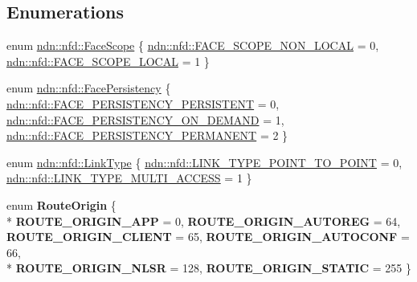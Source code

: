 \subsection*{Enumerations}
\begin{DoxyCompactItemize}
\item 
enum \hyperlink{group__management_gaa49e0fd703a14e5bf904d15428fd6059}{ndn\+::nfd\+::\+Face\+Scope} \{ \hyperlink{group__management_ggaa49e0fd703a14e5bf904d15428fd6059ab79946898b7e484062fa9eae0df1e67d}{ndn\+::nfd\+::\+F\+A\+C\+E\+\_\+\+S\+C\+O\+P\+E\+\_\+\+N\+O\+N\+\_\+\+L\+O\+C\+AL} = 0, 
\hyperlink{group__management_ggaa49e0fd703a14e5bf904d15428fd6059a96a6343f404f0aaea1ab481bdc704f59}{ndn\+::nfd\+::\+F\+A\+C\+E\+\_\+\+S\+C\+O\+P\+E\+\_\+\+L\+O\+C\+AL} = 1
 \}
\item 
enum \hyperlink{group__management_ga05df4b7c484a0fae25d3e65962511bac}{ndn\+::nfd\+::\+Face\+Persistency} \{ \hyperlink{group__management_gga05df4b7c484a0fae25d3e65962511bacaaebdd2e1f8ad08e833602ba66aed6de0}{ndn\+::nfd\+::\+F\+A\+C\+E\+\_\+\+P\+E\+R\+S\+I\+S\+T\+E\+N\+C\+Y\+\_\+\+P\+E\+R\+S\+I\+S\+T\+E\+NT} = 0, 
\hyperlink{group__management_gga05df4b7c484a0fae25d3e65962511baca96bad6012957ccb9a479076d632d4657}{ndn\+::nfd\+::\+F\+A\+C\+E\+\_\+\+P\+E\+R\+S\+I\+S\+T\+E\+N\+C\+Y\+\_\+\+O\+N\+\_\+\+D\+E\+M\+A\+ND} = 1, 
\hyperlink{group__management_gga05df4b7c484a0fae25d3e65962511bacab48510009b1ffbcc656493c424aa3446}{ndn\+::nfd\+::\+F\+A\+C\+E\+\_\+\+P\+E\+R\+S\+I\+S\+T\+E\+N\+C\+Y\+\_\+\+P\+E\+R\+M\+A\+N\+E\+NT} = 2
 \}
\item 
enum \hyperlink{group__management_gaa49a53cb4fe262ed33b001ccbe9c3502}{ndn\+::nfd\+::\+Link\+Type} \{ \hyperlink{group__management_ggaa49a53cb4fe262ed33b001ccbe9c3502adc3535befa39ead35928cf9a5909605a}{ndn\+::nfd\+::\+L\+I\+N\+K\+\_\+\+T\+Y\+P\+E\+\_\+\+P\+O\+I\+N\+T\+\_\+\+T\+O\+\_\+\+P\+O\+I\+NT} = 0, 
\hyperlink{group__management_ggaa49a53cb4fe262ed33b001ccbe9c3502acf21238d2c439677204c50eab920a904}{ndn\+::nfd\+::\+L\+I\+N\+K\+\_\+\+T\+Y\+P\+E\+\_\+\+M\+U\+L\+T\+I\+\_\+\+A\+C\+C\+E\+SS} = 1
 \}
\item 
enum {\bfseries Route\+Origin} \{ \\*
{\bfseries R\+O\+U\+T\+E\+\_\+\+O\+R\+I\+G\+I\+N\+\_\+\+A\+PP} = 0, 
{\bfseries R\+O\+U\+T\+E\+\_\+\+O\+R\+I\+G\+I\+N\+\_\+\+A\+U\+T\+O\+R\+EG} = 64, 
{\bfseries R\+O\+U\+T\+E\+\_\+\+O\+R\+I\+G\+I\+N\+\_\+\+C\+L\+I\+E\+NT} = 65, 
{\bfseries R\+O\+U\+T\+E\+\_\+\+O\+R\+I\+G\+I\+N\+\_\+\+A\+U\+T\+O\+C\+O\+NF} = 66, 
\\*
{\bfseries R\+O\+U\+T\+E\+\_\+\+O\+R\+I\+G\+I\+N\+\_\+\+N\+L\+SR} = 128, 
{\bfseries R\+O\+U\+T\+E\+\_\+\+O\+R\+I\+G\+I\+N\+\_\+\+S\+T\+A\+T\+IC} = 255
 \}\hypertarget{group__management_gad8a7e51433970880a2662bc78c8aa64c}{}\label{group__management_gad8a7e51433970880a2662bc78c8aa64c}


\end{DoxyCompactItemize}
